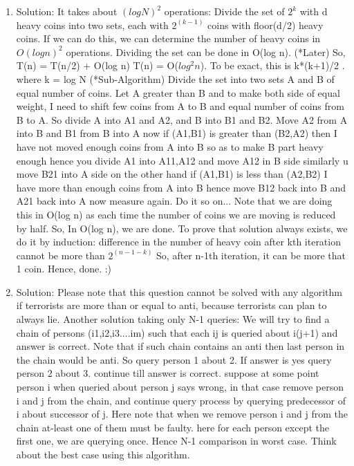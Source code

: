 \begin{enumerate}
\item
Solution: It takes about $(log N)^2$ operations:
Divide the set of $2^k$ with d heavy coins into two sets, each with $2^(k-1)$ coins with floor(d/2) heavy coins. If we can do this, we can determine the number of heavy coins in $O(log n)^2$ operations.
Dividing the set can be done in O(log n). (*Later)
So, T(n) = T(n/2) + O(log n)
T(n) = O($log^2 n$).
To be exact, this is k*(k+1)/2 . where k = log N
(*Sub-Algorithm)
Divide the set into two sets A and B of equal number of coins. Let A greater than B and to make both side of equal weight, I need to shift few coins from A to B and equal number of coins from B to A. So divide A into A1 and A2, and B into B1 and B2. Move A2 from A into B and B1 from B into A now if (A1,B1) is greater than (B2,A2) then I have not moved enough coins from A into B so as to make B part heavy enough hence you divide A1 into A11,A12 and move A12 in B side similarly u move B21 into A side on the other hand if (A1,B1) is less than (A2,B2) I have more than enough coins from A into B hence move B12 back into B and A21 back into A now measure again. Do it so on...
Note that we are doing this in O(log n) as each time the number of coins we are moving is reduced by half. So, In O(log n), we are done.
To prove that solution always exists, we do it by induction:
difference in the number of heavy coin after kth iteration cannot be more than $2^(n-1-k)$
So, after n-1th iteration, it can be more that 1 coin. Hence, done. :)




\item
Solution: Please note that this question cannot be solved with any algorithm if terrorists are more than or equal to anti, because terrorists can plan to always lie.
Another solution taking only N-1 queries:
We will try to find a chain of persons (i1,i2,i3....im) such that each ij is queried about i(j+1) and answer is correct. Note that if such chain contains an anti then last person in the chain would be anti. So query person 1 about 2. If answer is yes query person 2 about 3. continue till answer is correct. suppose at some point person i when queried about person j says wrong, in that case remove person i and j from the chain, and continue query process by querying predecessor of i about successor of j. Here note that when we remove person i and j from the chain at-least one of them must be faulty. here for each person except the first one, we are querying once. Hence N-1 comparison in worst case. Think about the best case using this algorithm.




\end{enumerate}
